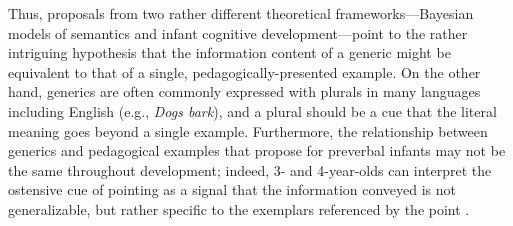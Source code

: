 \documentclass[10pt,letterpaper]{article}
\newcommand{\soph}[1]{\textcolor{Green}{[sb: #1]}}
\begin{document}
Thus, proposals from two rather different theoretical frameworks---Bayesian models of semantics and infant cognitive development---point to the rather intriguing hypothesis that the information content of a generic might be equivalent to that of a single, pedagogically-presented example.
On the other hand, generics are often commonly expressed with plurals in many languages including English (e.g., \emph{Dogs bark}), and a plural should be a cue that the literal meaning goes beyond a single example.
Furthermore, the relationship between generics and pedagogical examples that  propose for preverbal infants may not be the same throughout development; indeed, 3- and 4-year-olds can interpret the ostensive cue of pointing as a signal that the information conveyed is not generalizable, but rather specific to the exemplars referenced by the point \cite{meyer2013pointing}.

\end{document}
